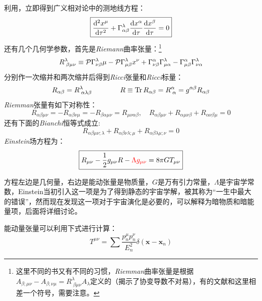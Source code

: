 \documentclass{ctexart}
\newcommand{\dotemph}[1]{\CJKunderdot{#1}}
\begin{document}
	利用\dotemph{等效原理}，立即得到广义相对论中的测地线方程：
	\begin{equation}
		\boxed{
		\dv[2]{x^\mu}{\tau}+\Gamma^\lambda_{\alpha\beta}\dv{x^\alpha}{\tau}	\dv{x^\beta}{\tau}	=0
	}
	\end{equation}
	还有几个几何学参数，首先是\textit{Riemann}曲率张量：\footnote{这里不同的书又有不同的习惯，\textit{Riemman}曲率张量是根据$A_{\beta;\mu\nu}-A_{\beta;\nu\mu}=R^\lambda_{\;\beta\mu\nu}A_\lambda$定义的（揭示了协变导数不对易），有的文献和这里相差一个符号，需要注意。}
	\begin{equation}
		R^{\lambda}_{\;\beta\mu\nu}\equiv\pv{\Gamma^\lambda_{\nu\beta}}{\mu}-\pv{\Gamma^{\lambda}_{\mu\beta}}{x^\nu}+\Gamma^\alpha_{\nu\beta}\Gamma^\lambda_{\mu\alpha}-\Gamma^{\alpha}_{\mu\beta}\Gamma^\lambda_{\nu\alpha}
	\end{equation}
	分别作一次缩并和两次缩并后得到\textit{Ricci}张量和\textit{Ricci}标量：
	\begin{equation}
		R_{\alpha\beta}=R^\lambda_{\;\alpha\lambda\beta}\qquad \qquad R\equiv \Tr R_{\alpha\beta}=R^\alpha_{\;\alpha}=g^{\alpha\beta}R_{\alpha\beta}
	\end{equation}
	\textit{Riemman}张量有如下对称性：
	\begin{equation}
		R_{\alpha\beta\mu\nu}=-R_{\alpha\beta\nu\mu}=-R_{\beta\alpha\mu\nu}=R_{\mu\nu\alpha\beta},\quad	R_{\alpha\beta\mu\nu}+R_{\alpha\mu\nu\beta}+R_{\alpha\nu\beta\mu}=0
	\end{equation}
	还有下面的{\itshape Bianchi}恒等式成立:
	\begin{equation}
		R_{\alpha\beta\mu\nu;\lambda}+R_{\alpha\beta\nu\lambda;\mu}+R_{\alpha\beta\lambda\mu;\nu}=0
	\end{equation}
	\textit{Einstein}场方程为：
	\begin{equation}
		\label{GREQ}
		\boxed{
		R_{\mu\nu}-\frac{1}{2}g_{\mu\nu}R-{\color{red} \Lambda g_{\mu\nu}}=8\pi G T_{\mu\nu}
	}
	\end{equation}
	
	方程左边是几何量，右边是能动张量是物质量，$G$是万有引力常量，$\Lambda$是宇宙学常数，Einstein当初引入这一项是为了得到静态的宇宙学解，被其称为“一生中最大的错误”，然而现在发现这一项对于宇宙演化是必要的，可以解释为暗物质和暗能量项，后面将详细讨论。
	
	能动量张量可以利用下式进行计算：
	\begin{equation}
		T^{\mu\nu}=\sum\frac{p_n^\mu p_n^\nu}{E_n^2}\delta\left(\mathbf{x}-\mathbf{x}_n\right)
	\end{equation}
\end{document}
